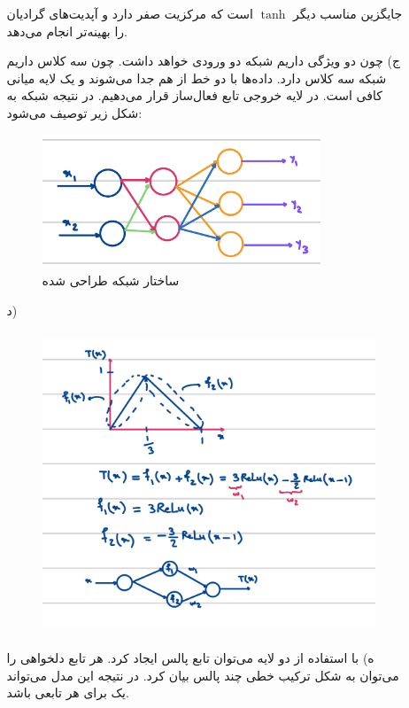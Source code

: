 \documentclass[a4paper]{article}
\begin{document}
\begin{itemize}
\begin{itemize}
	جایگزین مناسب دیگر
	$\tanh$
	است که مرکزیت صفر دارد و آپدیت‌های گرادیان را بهینه‌تر انجام می‌دهد.
	\item[ج)]
	چون دو ویژگی داریم شبکه دو ورودی خواهد داشت. چون سه کلاس داریم شبکه سه کلاس دارد. داده‌ها با دو خط از هم جدا می‌شوند و یک لایه میانی کافی است. در لایه خروجی تابع فعال‌ساز
	قرار می‌دهیم. در نتیجه شبکه به شکل زیر توصیف می‌شود:
	\begin{figure}[!h]
	\begin{center}
		\includegraphics[height=4cm]{pic1.jpg}
	\end{center}
	\caption{ساختار شبکه طراحی شده}
	\end{figure}
	\newpage
	\item[د)]
‌
		\begin{figure}[!h]
		\begin{center}
			\includegraphics[height=9cm]{pic2.jpg}
		\end{center}
	\end{figure}
	\item[ه)]
	با استفاده از دو لایه می‌توان تابع پالس ایجاد کرد. هر تابع دلخواهی را می‌توان به شکل ترکیب خطی چند پالس بیان کرد. در نتیجه این مدل 
	می‌تواند یک 
	برای هر تابعی باشد.
		\begin{figure}[!h]

\end{figure}
\end{itemize}
\end{itemize}
\end{document}
